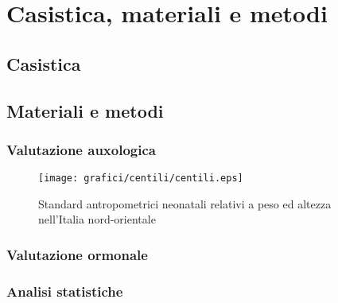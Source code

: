 \chapter{Casistica, materiali e metodi}

\section{Casistica}

\section{Materiali e metodi}

\subsection{Valutazione auxologica}

\begin{figure}[h]
  \begin{center}
      \texttt{[image: grafici/centili/centili.eps]} %
  \end{center}
  \caption{Standard antropometrici neonatali relativi a peso ed altezza nell'Italia nord-orientale}
\end{figure}

\subsection{Valutazione ormonale}

\subsection{Analisi statistiche}
